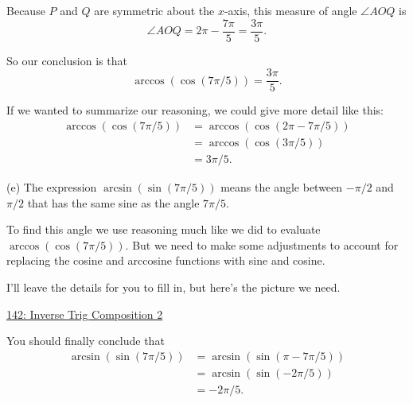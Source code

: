 \documentclass{ximera}
\begin{document}
\begin{question}
\begin{explanation}
Because $P$ and $Q$ are symmetric about the $x$-axis, this measure of angle $\angle AOQ$ is
\[
   \angle AOQ = 2\pi - \frac{7\pi}{5} = \frac{3\pi}{5}.
\]
 
So our conclusion is that
\[
     \arccos (\cos (7\pi/5)) = \frac{3\pi}{5}.
\]

If we wanted to summarize our reasoning, we could give more detail like this:
\begin{align*}
 \arccos (\cos (7\pi/5)) &= \arccos (\cos (2\pi - 7\pi/5)) \\
                                 &= \arccos (\cos (3\pi/5)) \\
                                 & = 3\pi/5 .
\end{align*}


(e) The expression $\arcsin (\sin (7\pi/5))$ means the angle between $-\pi/2$ and $\pi/2$ that has the same sine as the angle $7\pi/5$.

To find this angle we use reasoning much like we did to evaluate $\arccos (\cos (7\pi/5))$. But we need to make some adjustments to account for replacing the cosine and arccosine functions with sine and cosine.

I'll leave the details for you to fill in, but here's the picture we need.

\href{https://www.desmos.com/calculator/ilztfm9da1}{142: Inverse Trig Composition 2}

 
\begin{onlineOnly}
    \begin{center}
\end{center}
\end{onlineOnly}

You should finally conclude that
\begin{align*}
 \arcsin (\sin (7\pi/5)) &= \arcsin (\sin (\pi - 7\pi/5)) \\
                                 &= \arcsin (\sin (-2\pi/5)) \\
                                 & = -2\pi/5 .
\end{align*}

\end{explanation}


\end{question}
\end{document}
